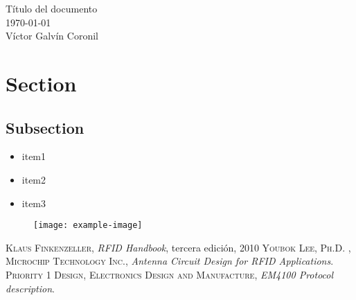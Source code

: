 \documentclass[spanish,11pt,a4paper]{article}
\title{}
\date{\today}
\author{Víctor Galvín Coronil}
\begin{document}
\tableofcontents

\newpage

   \begin{center}
      \Huge{Título del documento}\\[0.5cm]
      \large\today \\[0.5cm]
      \large Víctor Galvín Coronil\\[1cm]      
   \end{center}


\section{Section}
\blindtext

\subsection{Subsection}

\begin{itemize}
\item item1
\item item2
\item item3
\end{itemize}

\begin{figure}[!h]
	\texttt{[image: example-image]}
	\centering
\end{figure}

\newpage
\renewcommand{\refname}{Bibliografía}
\begin{thebibliography}{X}
	 \textsc{Klaus Finkenzeller},
	\textit{RFID Handbook}, tercera edición, 2010
	 \textsc{Youbok Lee, Ph.D.} , \textsc{Microchip Technology Inc.},
	\textit{Antenna Circuit Design for RFID Applications}.
	 \textsc{Priority 1 Design, Electronics Design and Manufacture},
	\textit{EM4100 Protocol description}.
\end{thebibliography}
\end{document}
